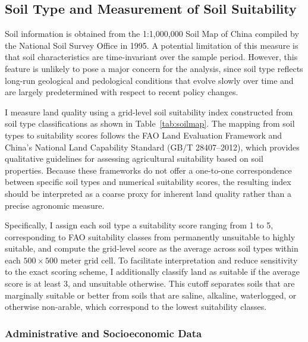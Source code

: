 \subsection{Soil Type and Measurement of Soil Suitability}

Soil information is obtained from the 1:1,000,000 Soil Map of China compiled by the National Soil Survey Office in 1995. A potential limitation of this measure is that soil characteristics are time-invariant over the sample period. However, this feature is unlikely to pose a major concern for the analysis, since soil type reflects long-run geological and pedological conditions that evolve slowly over time and are largely predetermined with respect to recent policy changes. 

I measure land quality using a grid-level soil suitability index constructed from soil type classifications as shown in Table~\ref{tab:soilmap}. The mapping from soil types to suitability scores follows the FAO Land Evaluation Framework and China’s National Land Capability Standard (GB/T 28407–2012), which provides qualitative guidelines for assessing agricultural suitability based on soil properties. Because these frameworks do not offer a one-to-one correspondence between specific soil types and numerical suitability scores, the resulting index should be interpreted as a coarse proxy for inherent land quality rather than a precise agronomic measure.

Specifically, I assign each soil type a suitability score ranging from 1 to 5, corresponding to FAO suitability classes from permanently unsuitable to highly suitable, and compute the grid-level score as the average across soil types within each $500 \times 500$ meter grid cell. To facilitate interpretation and reduce sensitivity to the exact scoring scheme, I additionally classify land as suitable if the average score is at least 3, and unsuitable otherwise. This cutoff separates soils that are marginally suitable or better from soils that are saline, alkaline, waterlogged, or otherwise non-arable, which correspond to the lowest suitability classes. 

\begin{table}[h]
    \centering
    \caption{Mapping Soil Types to Suitability Classes}
    
    \label{tab:soilmap}
\end{table}

\subsubsection{Administrative and Socioeconomic Data}

